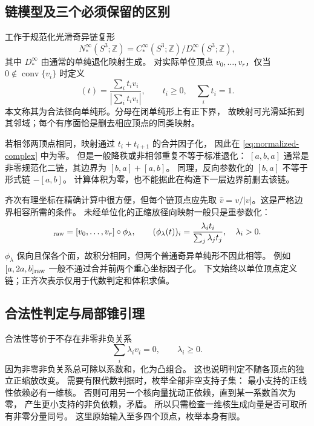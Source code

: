\documentclass[UTF8,11pt,fontset=none]{ctexart}
\numberwithin{equation}{section}
\theoremstyle{definition}
\DeclareMathOperator{\conv}{conv}
\newcommand{\Z}{\mathbb Z}
\begin{document}
\subsection{链模型及三个必须保留的区别}

工作于规范化光滑奇异链复形
\begin{equation}
 N_*^\infty(S^3;\Z)
 =C_*^\infty(S^3;\Z)/D_*^\infty(S^3;\Z),
 \label{eq:normalized-complex}
\end{equation}
其中 $D_*^\infty$ 由通常的单纯退化映射生成。
对实际单位顶点 $v_0,\ldots,v_r$，仅当 $0\notin\conv\{v_i\}$ 时定义
\begin{equation}
 [v_0,\ldots,v_r](t)
 =\frac{\sum_i t_iv_i}{|\sum_i t_iv_i|},\qquad
 t_i\ge0,\quad\sum_i t_i=1.
 \label{eq:ordered-simplex}
\end{equation}
本文称其为合法径向单纯形。分母在闭单纯形上有正下界，
故映射可光滑延拓到其邻域；每个有序面恰是删去相应顶点的同类映射。

若相邻两顶点相同，映射通过 $t_i+t_{i+1}$ 的合并因子化，
因此在 \eqref{eq:normalized-complex} 中为零。
但是一般降秩或非相邻重复不等于标准退化：
$[a,b,a]$ 通常是非零规范化二链，其边界为 $[b,a]+[a,b]$。
同理，反向参数化的 $[b,a]$ 不等于形式链 $-[a,b]$。
计算体积为零，也不能据此在构造下一层边界前删去该链。

齐次有理坐标在精确计算中很方便，但每个链顶点应先取
$\widehat v=v/|v|$。这是严格边界相容所需的条件。
未经单位化的正缩放径向映射一般只是重参数化：
\begin{equation}
 [\lambda_0v_0,\ldots,\lambda_rv_r]_{\rm raw}
 =[v_0,\ldots,v_r]\circ\phi_\lambda,\qquad
 (\phi_\lambda(t))_i=
 \frac{\lambda_it_i}{\sum_j\lambda_jt_j},\quad \lambda_i>0.
 \label{eq:rescaling}
\end{equation}
$\phi_\lambda$ 保向且保各个面，故积分相同，但两个普通奇异单纯形不因此相等。
例如 $[a,2a,b]_{\rm raw}$ 一般不通过合并前两个重心坐标因子化。
下文始终以单位顶点定义链；正齐次表示仅用于代数判定和体积求值。

\subsection{合法性判定与局部锥引理}

合法性等价于不存在非零非负关系
\begin{equation}
 \sum_i\lambda_iv_i=0,\qquad \lambda_i\ge0.
 \label{eq:positive-dependence}
\end{equation}
因为非零非负关系总可除以系数和，化为凸组合。
这也说明判定不随各顶点的独立正缩放改变。
需要有限代数判据时，枚举全部非空支持子集：
最小支持的正线性依赖必有一维核。
否则可用另一个核向量扰动正依赖，直到某一系数首次为零，
产生更小支持的非负依赖，矛盾。
所以只需检查一维核生成向量是否可取所有非零分量同号。
这里原始输入至多四个顶点，枚举本身有限。
\end{document}
